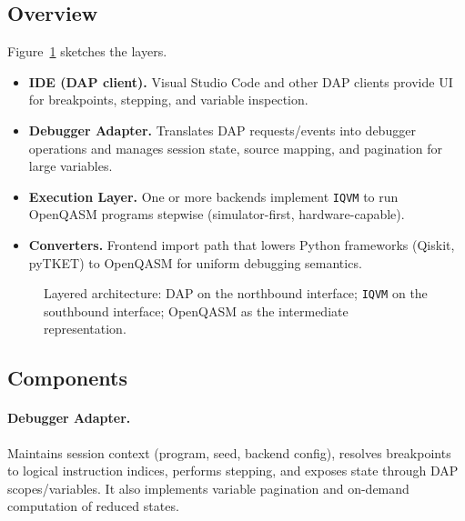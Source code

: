 \documentclass[12pt]{article}
\begin{document}
\subsection{Overview}

Figure~\ref{fig:layers} sketches the layers.

\begin{itemize}
  \item \textbf{IDE (DAP client).} Visual Studio Code and other DAP clients provide UI for breakpoints, stepping, and variable inspection.
  \item \textbf{Debugger Adapter.} Translates DAP requests/events into debugger operations and manages session state, source mapping, and pagination for large variables.
  \item \textbf{Execution Layer.} One or more backends implement \texttt{IQVM} to run OpenQASM programs stepwise (simulator-first, hardware-capable).
  \item \textbf{Converters.} Frontend import path that lowers Python frameworks (Qiskit, pyTKET) to OpenQASM for uniform debugging semantics.
\end{itemize}

\begin{figure}[t]
  \centering
  \caption{Layered architecture: DAP on the northbound interface; \texttt{IQVM} on the southbound interface; OpenQASM as the intermediate representation.}
  \label{fig:layers}
\end{figure}

\subsection{Components}

\paragraph{Debugger Adapter.}
Maintains session context (program, seed, backend config), resolves breakpoints to logical instruction indices, performs stepping, and exposes state through DAP scopes/variables. It also implements variable pagination and on-demand computation of reduced states.
\end{document}
